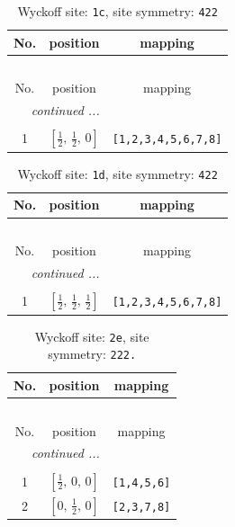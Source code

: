 \documentclass[fleqn,8pt]{jsarticle}
\begin{document}
\begin{longtable}{ccc}
\caption{Wyckoff site: {\tt 1c}, site symmetry: {\tt 422}}
 \\
 \hline \hline
No. & position & mapping \\ \hline \endfirsthead

\multicolumn{2}{l}{\tablename\ \thetable{}} \\
 \hline \hline
No. & position & mapping \\ \hline \endhead

 \hline \hline
\multicolumn{2}{r}{\footnotesize\it continued ...} \\ \endfoot

 \hline \hline
\multicolumn{2}{r}{} \\ \endlastfoot

1 & $\left[ \frac{1}{2},\, \frac{1}{2},\, 0 \right]$ & {\tt [1,2,3,4,5,6,7,8]} \\
\end{longtable}
\renewcommand{\arraystretch}{1.2}
\begin{longtable}{ccc}
\caption{Wyckoff site: {\tt 1d}, site symmetry: {\tt 422}}
 \\
 \hline \hline
No. & position & mapping \\ \hline \endfirsthead

\multicolumn{2}{l}{\tablename\ \thetable{}} \\
 \hline \hline
No. & position & mapping \\ \hline \endhead

 \hline \hline
\multicolumn{2}{r}{\footnotesize\it continued ...} \\ \endfoot

 \hline \hline
\multicolumn{2}{r}{} \\ \endlastfoot

1 & $\left[ \frac{1}{2},\, \frac{1}{2},\, \frac{1}{2} \right]$ & {\tt [1,2,3,4,5,6,7,8]} \\
\end{longtable}
\renewcommand{\arraystretch}{1.2}
\begin{longtable}{ccc}
\caption{Wyckoff site: {\tt 2e}, site symmetry: {\tt 222.}}
 \\
 \hline \hline
No. & position & mapping \\ \hline \endfirsthead

\multicolumn{2}{l}{\tablename\ \thetable{}} \\
 \hline \hline
No. & position & mapping \\ \hline \endhead

 \hline \hline
\multicolumn{2}{r}{\footnotesize\it continued ...} \\ \endfoot

 \hline \hline
\multicolumn{2}{r}{} \\ \endlastfoot

1 & $\left[ \frac{1}{2},\, 0,\, 0 \right]$ & {\tt [1,4,5,6]} \\ \hline
2 & $\left[ 0,\, \frac{1}{2},\, 0 \right]$ & {\tt [2,3,7,8]} \\
\end{longtable}
\end{document}
